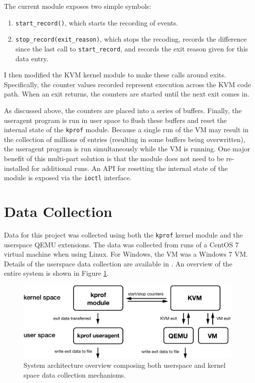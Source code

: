 \documentclass[notitlepage]{article}
\begin{document}
The current module exposes two simple symbols:
\begin{enumerate}
    \item{\texttt{start\_record()}, which starts the recording of events.}
    \item{\texttt{stop\_record(exit\_reason)}, which stops the recoding, records
        the difference since the last call to \texttt{start\_record}, and
    records the exit reason given for this data entry.}
\end{enumerate}

I then modified the KVM kernel module to make these calls around exits.
Specifically, the counter values recorded represent execution across the KVM
code path. When an exit returns, the counters are started until the next exit
comes in.

As discussed above, the counters are placed into a series of buffers. Finally,
the useragent program is run in user space to flush these buffers and reset the
internal state of the \texttt{kprof} module. Because a single run of the VM may
result in the collection of millions of entries (resulting in some buffers being
overwritten), the useragent program is run simultaneously while the VM is
running. One major benefit of this multi-part solution is that the module does
not need to be re-installed for additional runs. An API for resetting the
internal state of the module is exposed via the \texttt{ioctl} interface.


\section{Data Collection}
Data for this project was collected using both the \texttt{kprof} kernel module
and the userspace QEMU extensions. The data was collected from runs of a CentOS
7 virtual machine when using Linux. For Windows, the VM was a Windows 7 VM.
Details of the userspace data collection are available in \cite{f14}. An
overview of the entire system is shown in Figure \ref{fig:diagram}.

\begin{figure}[htp]
    \centering
    \includegraphics[width=4.5in]{diagram.pdf}
    \caption{System architecture overview composing both userspace and kernel
    space data collection mechanisms.}
    \label{fig:diagram}
\end{figure}
\end{document}

